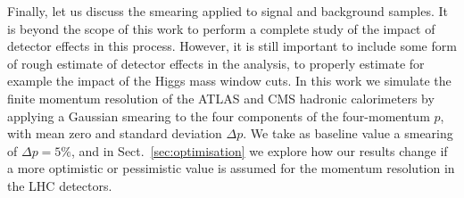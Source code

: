 Finally, let us discuss the smearing applied to signal
and background samples.
%
It is beyond the scope of this work to perform a complete study of the impact of
detector effects in this process.
%
However, it is still important to include some form of rough estimate of detector
effects in the analysis, to properly estimate for example the impact
of the Higgs mass window cuts.
%
In this work we simulate the finite momentum resolution of the ATLAS and CMS
hadronic calorimeters by applying a Gaussian smearing to the four components
of the four-momentum $p$, with mean zero and standard deviation $\Delta p$.
%
We take as baseline value a smearing of $\Delta p=5\%$, and in
Sect.~\ref{sec:optimisation} we explore how our results change
if a more optimistic or pessimistic value is assumed for the momentum
resolution in the LHC detectors.
